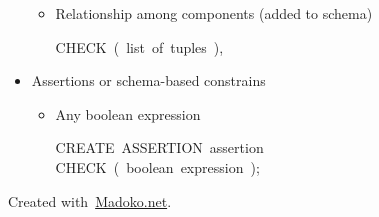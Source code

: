 \documentclass{article}
\begin{document}
\begin{itemize}
\begin{itemize}[noitemsep,topsep=\mdcompacttopsep]
\item{}Relationship among components 
(added to schema)\mdbr
\begin{mdpre}%
\noindent CHECK~(~list~of~tuples~),%
\end{mdpre}%
\end{itemize}%

\item{}
Assertions or schema-based constrains%

\begin{itemize}[noitemsep,topsep=\mdcompacttopsep]%

\item{}Any boolean expression
\begin{mdpre}%
\noindent CREATE~ASSERTION~assertion\\
CHECK~(~boolean~expression~);%
\end{mdpre}%
\end{itemize}%
\end{itemize}%

\begin{mdbmargintb}{4em}{}%
\begin{mdflushright}%
{\tiny{}Created with~\href{https://www.madoko.net}{Madoko.net}.}%
\end{mdflushright}%
\end{mdbmargintb}%
\end{document}

